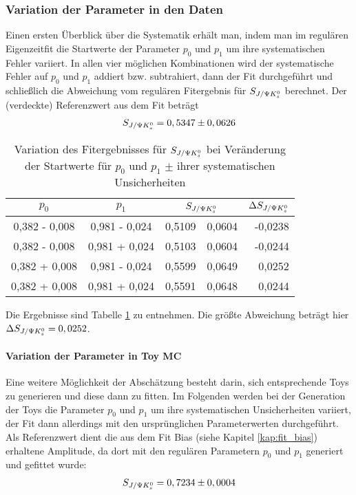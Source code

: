 \subsubsection{Variation der Parameter in den Daten}
Einen ersten Überblick über die Systematik erhält man, indem man
im regulären Eigenzeitfit die Startwerte der Parameter $p_0$ und $p_1$ um ihre systematischen Fehler variiert. In allen vier möglichen Kombinationen wird der systematische Fehler auf $p_0$ und $p_1$ addiert bzw. subtrahiert, dann der Fit durchgeführt und schließlich die Abweichung vom regulären Fitergebnis für $S_{J/\Psi K_s^0}$ berechnet. Der (verdeckte) Referenzwert aus dem Fit beträgt
\begin{align}
S_{J/\Psi K_s^0} = 0,5347 \pm 0,0626 
\end{align}

\begin{table}[hptb]
\centering
\caption{Variation des Fitergebnisses für $S_{J/\Psi K_s^0}$ bei Veränderung der Startwerte für $p_0$ und $p_1$ $\pm$ ihrer systematischen Unsicherheiten}
\label{tab:syst_fit_calib_data}
\begin{tabular}{cc|r@{$\pm$}l|r}
\hline\hline
$p_0$  &  $p_1$  &  \multicolumn{2}{c|}{$S_{J/\Psi K_s^0}$}  & $\Delta S_{J/\Psi K_s^0}$   \\ \hline
0,382 - 0,008  &  0,981 - 0,024  &  0,5109 & 0,0604  &  -0,0238 \\
0,382 - 0,008  &  0,981 + 0,024  &  0,5103 & 0,0604  &  -0,0244 \\
0,382 + 0,008  &  0,981 - 0,024  &  0,5599 & 0,0649  &   0,0252 \\
0,382 + 0,008  &  0,981 + 0,024  &  0,5591 & 0,0648  &   0,0244 \\
\hline\hline
\end{tabular}
\end{table}

Die Ergebnisse sind Tabelle \ref{tab:syst_fit_calib_data} zu entnehmen. Die größte Abweichung beträgt hier $\Delta S_{J/\Psi K_s^0} = 0,0252$.

\paragraph{Variation der Parameter in Toy MC}
Eine weitere Möglichkeit der Abschätzung besteht darin, sich entsprechende Toys zu generieren und diese dann zu fitten. Im Folgenden werden bei der Generation der Toys die Parameter $p_0$ und $p_1$ um ihre systematischen Unsicherheiten variiert, der Fit dann allerdings mit den ursprünglichen Parameterwerten durchgeführt. Als Referenzwert dient die aus dem Fit Bias (siehe Kapitel \ref{kap:fit_bias}) erhaltene Amplitude, da dort mit den regulären Parametern $p_0$ und $p_1$ generiert und gefittet wurde:
\begin{align}
S_{J/\Psi K_s^0} = 0,7234 \pm 0,0004
\end{align}

